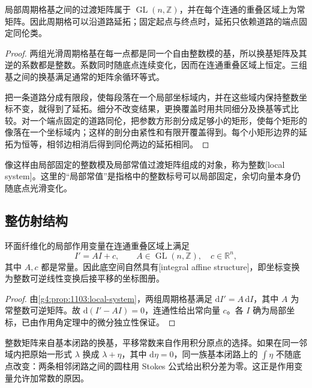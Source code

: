 \begin{proposition}\label{g4:prop:1103:local-system}
	局部周期格基之间的过渡矩阵属于 \(\operatorname{GL}(n,\mathbb Z)\)，并在每个连通的重叠区域上为常矩阵。因此周期格可以沿道路延拓；固定起点与终点时，延拓只依赖道路的端点固定同伦类。
\end{proposition}
\begin{proof}
	两组光滑周期格基在每一点都是同一个自由整数模的基，所以换基矩阵及其逆的系数都是整数。系数同时随底点连续变化，因而在连通重叠区域上恒定。三组基之间的换基满足通常的矩阵余循环等式。

	把一条道路分成有限段，使每段落在一个局部坐标域内，并在这些域内保持整数坐标不变，就得到了延拓。细分不改变结果，更换覆盖时用共同细分及换基等式比较。对一个端点固定的道路同伦，把参数方形剖分成足够小的矩形，使每个矩形的像落在一个坐标域内；这样的剖分由紧性和有限开覆盖得到。每个小矩形边界的延拓为恒等，相邻边相消后得到同伦两边的延拓相同。
\end{proof}

像这样由局部固定的整数模及局部常值过渡矩阵组成的对象，称为整数[local system]。这里的“局部常值”是指格中的整数标号可以局部固定，余切向量本身仍随底点光滑变化。

\subsection{整仿射结构}
\label{g4:subsec:1103:02}
\begin{proposition}\label{g4:prop:1103:integral-affine}
	环面纤维化的局部作用变量在连通重叠区域上满足
	\begin{equation}\label{g4:eq:1103:affine-transition}
		I'=AI+c,\qquad A\in\operatorname{GL}(n,\mathbb Z),\quad c\in\mathbb R^n,
	\end{equation}
	其中 \(A,c\) 都是常量。因此底空间自然具有[integral affine structure]，即坐标变换为整数可逆线性变换后接平移的坐标图册。
\end{proposition}
\begin{proof}
	由\cref{g4:prop:1103:local-system}，两组周期格基满足 \(\mathrm{d}I'=A\,\mathrm{d}I\)，其中 \(A\) 为常整数可逆矩阵。故 \(\mathrm{d}(I'-AI)=0\)，连通性给出常向量 \(c\)。各 \(I\) 确为局部坐标，已由作用角定理中的微分独立性保证。
\end{proof}

整数矩阵来自基本闭路的换基，平移常数来自作用积分原点的选择。如果在同一邻域内把原始一形式 \(\lambda\) 换成 \(\lambda+\eta\)，其中 \(\mathrm{d}\eta=0\)，同一族基本闭路上的 \(\int\eta\) 不随底点改变：两条相邻闭路之间的圆柱用 Stokes 公式给出积分差为零。这正是作用变量允许加常数的原因。

